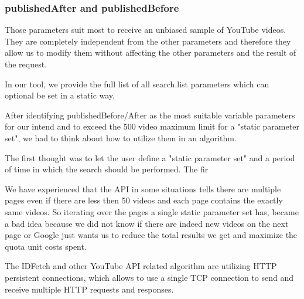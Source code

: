 \subsubsection{publishedAfter and publishedBefore}
Those parameters suit most to receive an unbiased sample of YouTube videos. They are completely independent from the other parameters and
therefore they allow us to modify them without affecting the other parameters and the result of the request.


In our tool, we provide the full list of all search.list parameters which can optional be set in a static way.


After identifying publishedBefore/After as the most suitable variable parameters for our intend and to exceed the 500 video maximum limit for
a "static parameter set", we had to think about how to utilize them in an algorithm.

The first thought was to let the user define a "static parameter set" and a period of time in which the search should be performed.
The fir

We have experienced that the API in some situations tells there are multiple pages even if there are less then 50 videos and each page
contains the exactly same videos.
So iterating over the pages a single static parameter set has, became a bad idea because we did not know if there are indeed new videos
on the next page or Google just wants us to reduce the total results we get and maximize the quota unit costs spent.




The IDFetch and other YouTube API related algorithm are utilizing HTTP persistent connections, which allows to use a single TCP connection to
send and receive multiple HTTP requests and responses.
